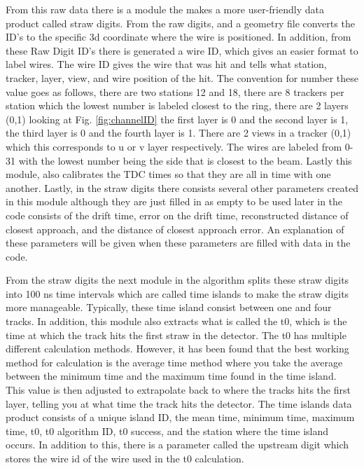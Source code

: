 \documentclass[./Thesis]{subfiles}
\begin{document}
	
	From this raw data there is a module the makes a more user-friendly data product called straw digits.  From the raw digits, and a geometry file converts the ID's to the specific 3d coordinate where the wire is positioned.  In addition, from these Raw Digit ID's there is generated a wire ID, which gives an easier format to label wires.  The wire ID gives the wire that was hit and tells what station, tracker, layer, view, and wire position of the hit.  The convention for number these value goes as follows, there are two stations 12 and 18, there are 8 trackers per station which the lowest number is labeled closest to the ring, there are 2 layers (0,1) looking at Fig. \ref{fig:channelID} the first layer is 0 and the second layer is 1, the third layer is 0 and the fourth layer is 1. There are 2 views in a tracker (0,1) which this corresponds to u or v layer respectively. The wires are labeled from 0-31 with the lowest number being the side that is closest to the beam.  Lastly this module, also calibrates the TDC times so that they are all in time with one another.  Lastly, in the straw digits there consists several other parameters created in this module although they are just filled in as empty to be used later in the code consists of the drift time,  error on the drift time, reconstructed distance of closest approach, and the distance of closest approach error. An explanation of these parameters will be given when these parameters are filled with data in the code. 
	
	From the straw digits the next module in the algorithm splits these straw digits into 100 ns time intervals which are called time islands to make the straw digits more manageable.  Typically, these time island consist between one and four tracks.  In addition, this module also extracts what is called the t0, which is the time at which the track hits the first straw in the detector.  The t0 has multiple different calculation methods.  However, it has been found that the best working method for calculation is the average time method where you take the average between the minimum time and the maximum time found in the time island.  This value is then adjusted to extrapolate back to where the tracks hits the first layer, telling you at what time the track hits the detector.  The time islands data product consists of a unique island ID, the mean time, minimum time, maximum time, t0, t0 algorithm ID, t0 success, and the station where the time island occurs.  In addition to this, there is a parameter called the upstream digit which stores the wire id of the wire used in the t0 calculation.
	
\end{document}
